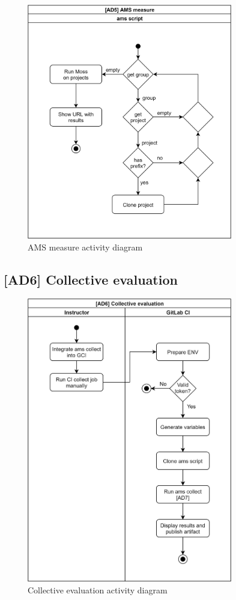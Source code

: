 \begin{figure}[H]
    \centering
    \includegraphics[width=0.8\textwidth,height=\textheight,keepaspectratio]{Figures/ad/ad17.png}
    \caption{AMS measure activity diagram}
\end{figure}

\subsection{{[}AD6{]} Collective evaluation} \label{ssec:ad6}

\begin{figure}[H]
    \centering
    \includegraphics[width=0.8\textwidth,height=\textheight,keepaspectratio]{Figures/ad/ad12.png}
    \caption{Collective evaluation activity diagram}
\end{figure}

